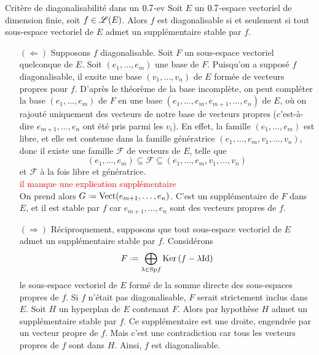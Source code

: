 \begin{prop}{Critère de diagonalisabilité dans un $0.7$-ev}
    Soit $E$ un $0.7$-espace vectoriel de dimension finie, soit $f \in \mathscr{L}(E)$. Alors $f$ est diagonalisable si et seulement si tout sous-espace vectoriel de $E$ admet un supplémentaire stable par $f$.
\end{prop}

\begin{preuve}
    \begin{itemize}
        \item[$(\Leftarrow)$] Supposons $f$ diagonalisable. Soit $F$ un sous-espace vectoriel quelconque de $E$. Soit $(e_1, \dots, e_m)$ une base de $F$. Puisqu'on a supposé $f$ diagonalisable, il exsite une base $(v_1, \dots, v_n)$ de $E$ formée de vecteurs propres pour $f$. D'après le théorème de la base incomplète, on peut compléter la base $(e_1, \dots, e_m)$ de $F$ en une base $(e_1, \dots, e_m, e_{m+1}, \dots, e_n)$ de $E$, où on rajouté uniquement des vecteurs de notre base de vecteurs propres (c'est-à-dire $e_{m+1}, \dots, e_n$ ont été pris parmi les $v_i$). En effet, la famille $(e_1, \dots, e_m)$ est libre, et elle est contenue dans la famille génératrice $(e_1, \dots, e_m, v_1, \dots, v_n)$, donc il existe une famille $\mathcal{F}$ de vecteurs de $E$, telle que 
        $$(e_1, \dots, e_m) \subseteq \mathcal{F} \subseteq (e_1, \dots, e_m, v_1, \dots, v_n)$$
        et $\mathcal{F}$ à la fois libre et génératrice. \\
        \textcolor{red}{il manque une explication supplémentaire} \\
        On prend alors $G \defeq \Vect(e_{m+1}, \dots, e_n)$. C'est un supplémentaire de $F$ dans $E$, et il est stable par $f$ car $e_{m+1}, \dots, e_n$ sont des vecteurs propres de $f$.
        \item[$(\Rightarrow)$] Réciproquement, supposons que tout sous-espace vectoriel de $E$ admet un supplémentaire stable par $f$. Considérons
        $$F \defeq \bigoplus_{\lambda \in \Sp f} \Ker(f - \lambda \Id)$$
        le sous-espace vectoriel de $E$ formé de la somme directe des sous-espaces propres de $f$. Si $f$ n'était pas diagonalisable, $F$ serait strictement inclus dans $E$. Soit $H$ un hyperplan de $E$ contenant $F$. Alors par hypothèse $H$ admet un supplémentaire stable par $f$. Ce supplémentaire est une droite, engendrée par un vecteur propre de $f$. Mais c'est une contradiction car tous les vecteurs propres de $f$ sont dans $H$. Ainsi, $f$ est diagonalisable. 
    \end{itemize}
\end{preuve}

